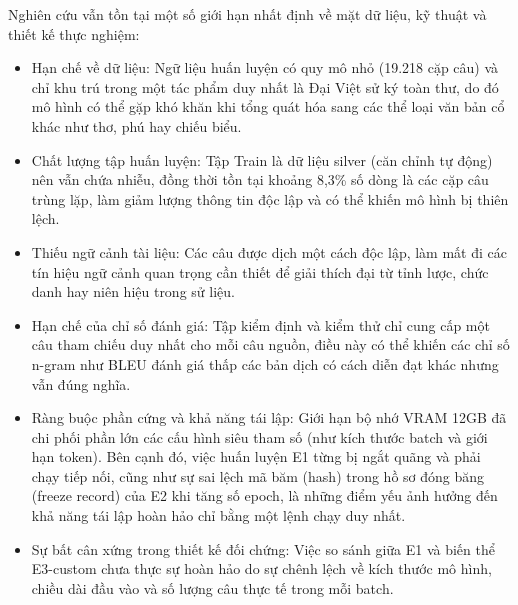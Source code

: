 Nghiên cứu vẫn tồn tại một số giới hạn nhất định về mặt dữ liệu, kỹ thuật và thiết kế thực nghiệm:
\begin{itemize}
\item Hạn chế về dữ liệu: Ngữ liệu huấn luyện có quy mô nhỏ (19.218 cặp câu) và chỉ khu trú trong một tác phẩm duy nhất là Đại Việt sử ký toàn thư, do đó mô hình có thể gặp khó khăn khi tổng quát hóa sang các thể loại văn bản cổ khác như thơ, phú hay chiếu biểu.  

\item Chất lượng tập huấn luyện: Tập Train là dữ liệu silver (căn chỉnh tự động) nên vẫn chứa nhiễu, đồng thời tồn tại khoảng 8,3\% số dòng là các cặp câu trùng lặp, làm giảm lượng thông tin độc lập và có thể khiến mô hình bị thiên lệch.  

\item Thiếu ngữ cảnh tài liệu: Các câu được dịch một cách độc lập, làm mất đi các tín hiệu ngữ cảnh quan trọng cần thiết để giải thích đại từ tỉnh lược, chức danh hay niên hiệu trong sử liệu.  

\item Hạn chế của chỉ số đánh giá: Tập kiểm định và kiểm thử chỉ cung cấp một câu tham chiếu duy nhất cho mỗi câu nguồn, điều này có thể khiến các chỉ số n-gram như BLEU đánh giá thấp các bản dịch có cách diễn đạt khác nhưng vẫn đúng nghĩa.  

\item Ràng buộc phần cứng và khả năng tái lập: Giới hạn bộ nhớ VRAM 12GB đã chi phối phần lớn các cấu hình siêu tham số (như kích thước batch và giới hạn token). Bên cạnh đó, việc huấn luyện E1 từng bị ngắt quãng và phải chạy tiếp nối, cũng như sự sai lệch mã băm (hash) trong hồ sơ đóng băng (freeze record) của E2 khi tăng số epoch, là những điểm yếu ảnh hưởng đến khả năng tái lập hoàn hảo chỉ bằng một lệnh chạy duy nhất.  

\item Sự bất cân xứng trong thiết kế đối chứng: Việc so sánh giữa E1 và biến thể E3-custom chưa thực sự hoàn hảo do sự chênh lệch về kích thước mô hình, chiều dài đầu vào và số lượng câu thực tế trong mỗi batch.
\end{itemize}
